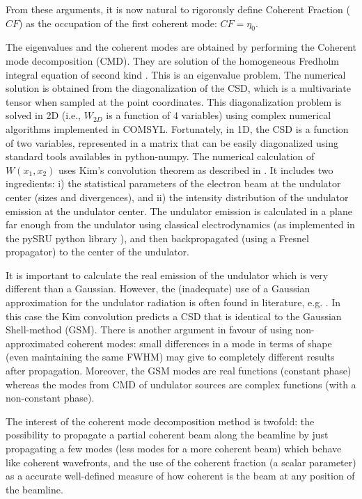 \documentclass{iucr}              %
\begin{document}
From these arguments, it is now natural to rigorously define Coherent Fraction ($CF$) as the occupation of the first coherent mode: $CF=\eta_0$.

The eigenvalues and the coherent modes are obtained by performing the Coherent mode decomposition (CMD). They are solution of the homogeneous Fredholm integral equation of second kind \cite{glass2017}. This is an eigenvalue problem. The numerical solution is obtained from the diagonalization of the CSD, which is a multivariate tensor when sampled at the point coordinates. This diagonalization problem is solved in 2D (i.e., $W_{2D}$ is a function of 4 variables) using complex numerical algorithms implemented in COMSYL. Fortunately, in 1D, the CSD is a function of two variables, represented in a matrix that can be easily diagonalized using standard tools availables in python-numpy. The numerical calculation of $W(x_1,x_2)$ uses Kim's convolution theorem \cite{kim1986b} as described in \cite{glass2017}. It includes two ingredients: i) the statistical parameters of the electron beam at the undulator center (sizes and divergences), and ii) the intensity distribution of the undulator emission at the undulator center. The undulator emission is calculated in a plane far enough from the undulator using classical electrodynamics \cite{jackson} (as implemented in the pySRU python library \cite{pySRU}), and then backpropagated (using a Fresnel propagator) to the center of the undulator. 

It is important to calculate the real emission of the undulator which is very different than a Gaussian. However, the (inadequate) use of a Gaussian approximation for the undulator radiation is often found in literature, e.g.  \cite{coisson1997}. In this case the Kim convolution predicts a CSD that is identical to the Gaussian Shell-method (GSM). There is another argument in favour of using non-approximated coherent modes: small differences in a mode in terms of shape (even maintaining the same FWHM) may give to completely different results after propagation. Moreover, the GSM modes are real functions (constant phase) whereas the modes from CMD of undulator sources are complex functions (with a non-constant phase).

The interest of the coherent mode decomposition method is twofold: the possibility to propagate a partial coherent beam along the beamline by just propagating a few modes (less modes for a more coherent beam) which behave like coherent wavefronts, and the use of the coherent fraction (a scalar parameter) as a accurate well-defined measure of how coherent is the beam at any position of the beamline.
\end{document}
